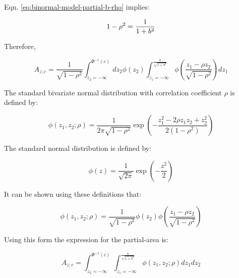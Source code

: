 \documentclass[
]{book}
\begin{document}
Eqn. \eqref{eq:binormal-model-partial-b-rho} implies:

\begin{equation}
1 - \rho^2 = \frac{1}{1+b^2}\\
\label{eq:binormal-model-simplification-4}
\end{equation}

Therefore,

\begin{equation}
A_{z;c} = \frac{1}{\sqrt{1-\rho^2}}\int_{z_2=-\infty}^{\Phi^{-1}\left ( c \right )} dz_2 \phi\left ( z_2 \right ) \int_{z_1=-\infty}^{\frac{a}{\sqrt{1+b^2}}} \phi\left ( \frac{z_1 - \rho z_2}{\sqrt{1-\rho^2}}\right ) dz_1
\label{eq:binormal-model-partial-area-double-integral-5}
\end{equation}

The standard bivariate normal distribution with correlation coefficient \(\rho\) is defined by:

\begin{equation}
\phi\left ( z_1,z_2;\rho \right ) = \frac{1}{2 \pi \sqrt{1-\rho^2}} \exp  \left ( -\frac{z_1^2 - 2 \rho z_1 z_2 + z_2^2}{2(1-\rho^2)}  \right )
\label{eq:binormal-model-definition-standard-bivariate-distribution}
\end{equation}

The standard normal distribution is defined by:

\begin{equation}
\phi\left ( z\right ) = \frac{1}{\sqrt{2 \pi }} \exp  \left ( -\frac{z^2}{2}  \right )
\label{eq:binormal-model-definition-standard-normal-distribution}
\end{equation}

It can be shown using these definitions that:

\begin{equation}
\phi\left ( z_1,z_2;\rho \right ) = \frac{1}{\sqrt{1-\rho^2}}\phi\left ( z_2 \right )\phi\left ( \frac{z_1-\rho z_2}{\sqrt{1-\rho^2}} \right )
\label{eq:binormal-model-standard-bivariate-distribution-2}
\end{equation}

Using this form the expression for the partial-area is:

\begin{equation}
A_{z;c} = \int_{z_2=-\infty}^{\Phi^{-1}\left ( c \right )}   \int_{z_1=-\infty}^{\frac{a}{\sqrt{1+b^2}}} \phi\left ( z_1,z_2;\rho \right ) dz_1dz_2
\label{eq:binormal-model-partial-area-final1}
\end{equation}
\end{document}
